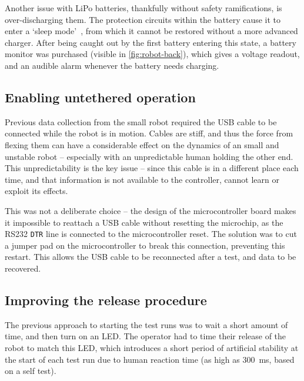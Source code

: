 \documentclass[main.tex]{subfiles}
\begin{document}
Another issue with LiPo batteries, thankfully without safety ramifications, is over-discharging them. The protection circuits within the battery cause it to enter a `sleep mode'~\cite{lipo-sleep-mode}, from which it cannot be restored without a more advanced charger. After being caught out by the first battery entering this state, a battery monitor was purchased (visible in \cref{fig:robot-back}), which gives a voltage readout, and an audible alarm whenever the battery needs charging.


\subsection{Enabling untethered operation}
	\label{sec:untethered}

	Previous data collection from the small robot required the USB cable to be connected while the robot is in motion. Cables are stiff, and thus the force from flexing them can have a considerable effect on the dynamics of an small and unstable robot -- especially with an unpredictable human holding the other end. This unpredictability is the key issue -- since this cable is in a different place each time, and that information is not available to the controller, {\Pilco} cannot learn or exploit its effects.

	This was not a deliberate choice -- the design of the microcontroller board makes it impossible to reattach a USB cable without resetting the microchip, as the RS232 \texttt{DTR} line is connected to the microcontroller reset\footnotemark. The solution was to cut a jumper pad on the microcontroller to break this connection, preventing this restart. This allows the USB cable to be reconnected after a test, and data to be recovered.


\subsection{Improving the release procedure}
	\label{sec:switch}

	The previous approach to starting the test runs was to wait a short amount of time, and then turn on an LED.
	The operator had to time their release of the robot to match this LED, which introduces a short period of artificial stability at the start of each test run due to human reaction time (as high as \SI{300}{\milli\second}, based on a self test).
\end{document}
